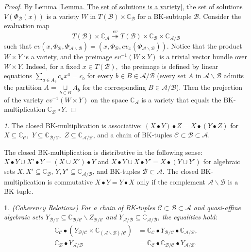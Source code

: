 \documentclass[11pt]{article}
\theoremstyle{plain}
\theoremstyle{definition}
\theoremstyle{remark}
\newtheorem{rem}[thm]{\protect\remarkname}
\theoremstyle{plain}
\theoremstyle{plain}
\theoremstyle{plain}
\newtheorem{cor}[thm]{\protect\corollaryname}
\theoremstyle{definition}
\providecommand{\corollaryname}{Corollary}
\providecommand{\remarkname}{Remark}
\begin{document}
\begin{proof}
By Lemma \ref{Lemma. The set of solutions is a variety}, the set
of solutions $V(\Phi_{\mathscr{B}}(x))$ is a variety $W$ in $T(\mathscr{B})\times\mathbb{C}_{\mathscr{B}}$
for a BK-subtuple $\mathscr{B}$. Consider the evaluation map 
\[
T(\mathscr{B})\times\mathbb{C}_{\mathscr{A}}\overset{ev}{\twoheadrightarrow}T(\mathscr{B})\times\mathbb{C}_{\mathscr{B}}\times\mathbb{C}_{\mathscr{A}/\mathscr{B}}
\]
such that $ev(x,\Phi_{\mathscr{B}},\Phi_{\mathscr{A}\backslash\mathscr{B}})=(x,\Phi_{\mathscr{B}},ev_{x}(\Phi_{\mathscr{A}\backslash\mathscr{B}}))$.
Notice that the product $W\times Y$ is a variety, and the preimage
$ev^{-1}(W\times Y)$ is a trivial vector bundle over $W\times Y$.
Indeed, for a fixed $x\in T(\mathscr{B}),$ the preimage is defined
by linear equations $\underset{a\in A_{b}}{\sum}c_{a}x^{a}=c_{b}$
for every $b\in B\in\mathscr{A}/\mathscr{B}$ (every set $A$ in $\mathscr{A}\backslash\mathscr{B}$
admits the partition $A=\underset{b\in B}{\sqcup}A_{b}$ for the corresponding
$B\in\mathscr{A}/\mathscr{B}$). Then the projection of the variety
$ev^{-1}(W\times Y)$ on the space $\mathbb{C}_{\mathscr{A}}$ is
a variety that equals the BK-multiplication $\mathbb{C}_{\mathscr{B}}\circ Y$.
\end{proof}
\begin{rem}
The closed BK-multiplication is associative: $(X\bullet Y)\bullet Z=X\bullet(Y\bullet Z)$
for $X\subseteq\mathbb{C}_{\mathscr{C}},$ $Y\subseteq\mathbb{C}_{\mathscr{B}/\mathscr{C}},$
$Z\subseteq\mathbb{C}_{\mathscr{A}/\mathscr{B}}$, and a chain of
BK-tuples $\mathscr{C}\subset\mathscr{B}\subset\mathscr{A}.$

The closed BK-multiplication is distributive in the following sense:
$X\bullet Y\cup X'\bullet Y=(X\cup X')\bullet Y$ and $X\bullet Y\cup X\bullet Y'=X\bullet(Y\cup Y')$
for algebraic sets $X,X'\subseteq\mathbb{C}_{\mathscr{B}}$, $Y,Y'\subseteq\mathbb{C}_{\mathscr{A}/\mathscr{B}}$,
and BK-tuples $\mathscr{B}\subset\mathscr{A}$. The closed BK-multiplication
is commutative $X\bullet Y=Y\bullet X$ only if the complement $\mathscr{A}\backslash\mathscr{B}$
is a BK-tuple.
\end{rem}

\begin{cor}
\label{Corollary. Coherency Relations}\textup{(Coherency Relations)}
For a chain of BK-tuples $\mathscr{C}\subset\mathscr{B}\subset\mathscr{A}$
and quasi-affine algebraic sets $Y_{\mathscr{B}/\mathscr{C}}\subseteq\mathbb{C}_{\mathscr{B}/\mathscr{C}}\backslash Z_{\mathscr{B}/\mathscr{C}}$
and $Y_{\mathscr{A}/\mathscr{B}}\subseteq\mathbb{C}_{\mathscr{A}/\mathscr{B}}$,
the equalities hold:
\begin{align*}
\mathbb{C}_{\mathscr{C}}\bullet(Y_{\mathscr{B}/\mathscr{C}}\times\mathbb{C}_{(\mathscr{A}\backslash\mathscr{B})/\mathscr{C}}) & =\mathbb{C}_{\mathscr{C}}\bullet Y_{\mathscr{B}/\mathscr{C}}\bullet\mathbb{C}_{\mathscr{A}/\mathscr{B}},\\
\mathbb{C}_{\mathscr{B}}\bullet Y_{\mathscr{A}/\mathscr{B}} & =\mathbb{C}_{\mathscr{C}}\bullet\mathbb{C}_{\mathscr{B}/\mathscr{C}}\bullet Y_{\mathscr{A}/\mathscr{B}}.
\end{align*}
\end{cor}
\end{document}
